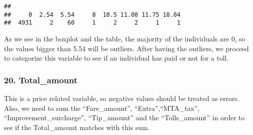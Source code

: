 \documentclass[
  18pt,
  a4paper]{article}
\newenvironment{Shaded}{\begin{snugshade}}{\end{snugshade}}
\newcommand{\CommentTok}[1]{\textcolor[rgb]{0.56,0.35,0.01}{\textit{#1}}}
\newcommand{\DecValTok}[1]{\textcolor[rgb]{0.00,0.00,0.81}{#1}}
\newcommand{\FloatTok}[1]{\textcolor[rgb]{0.00,0.00,0.81}{#1}}
\newcommand{\KeywordTok}[1]{\textcolor[rgb]{0.13,0.29,0.53}{\textbf{#1}}}
\newcommand{\NormalTok}[1]{#1}
\newcommand{\OperatorTok}[1]{\textcolor[rgb]{0.81,0.36,0.00}{\textbf{#1}}}
\newcommand{\OtherTok}[1]{\textcolor[rgb]{0.56,0.35,0.01}{#1}}
\newcommand{\StringTok}[1]{\textcolor[rgb]{0.31,0.60,0.02}{#1}}
\begin{document}
\begin{verbatim}
## 
##     0  2.54  5.54     8  10.5 11.08 11.75 18.04 
##  4931     2    60     1     2     2     1     1
\end{verbatim}

As we see in the boxplot and the table, the majority of the individuals
are 0, so the values bigger than 5.54 will be outliers. After having the
outliers, we proceed to categorize this variable to see if an individual
has paid or not for a toll.

\begin{Shaded}
\end{Shaded}

\hypertarget{total_amount}{%
\subsubsection{20. Total\_amount}\label{total_amount}}

This is a price related variable, so negative values should be treated
as errors. Also, we need to sum the ``Fare\_amount'',
``Extra'',``MTA\_tax'', ``Improvement\_surcharge'', ``Tip\_amount'' and
the ``Tolls\_amount'' in order to see if the Total\_amount matches with
this sum.

\begin{Shaded}
\end{Shaded}
\end{document}
